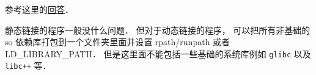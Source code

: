 
\begin{issues}
\issueDraft
\end{issues}


参考这里的\href{https://stackoverflow.com/questions/20183883/determining-binary-compatibility-under-linux}{回答}．

静态链接的程序一般没什么问题． 但对于动态链接的程序， 可以把所有非基础的 so 依赖库打包到一个文件夹里面并设置 rpath/runpath 或者 LD_LIBRARY_PATH． 但是这里面不能包括一些基础的系统库例如 \verb|glibc| 以及 \verb|libc++| 等．
